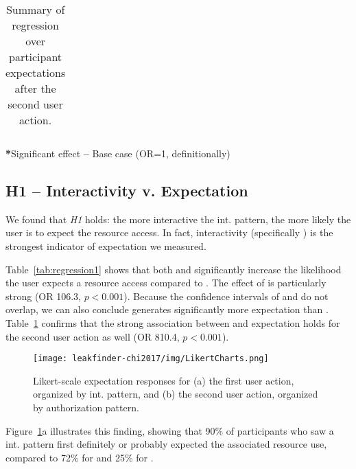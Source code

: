 \begin{table}[t]
\begin{threeparttable}
\begin{tabular}{l l r c r}
     \bottomrule \bottomrule
\end{tabular}
\begin{tablenotes}
     \small
     \item \textbf{*}Significant effect 
      \hspace*{2cm}
      \textbf{--} Base case (OR=1, definitionally)
   \end{tablenotes}
\end{threeparttable}
\caption{Summary of regression over participant expectations after the second
  user action.}
\label{tab:regression2}
\end{table}

\subsection{H1 -- Interactivity v. Expectation}
We found that \textit{H1} holds: the more interactive the int. pattern, the more likely the 
user is to expect the resource access. In fact, interactivity (specifically \interactive{})
is the strongest indicator of expectation we measured.

Table~\ref{tab:regression1} shows that both \interactive{} and \backgroundnotify{}
significantly increase the likelihood the user expects a resource access compared to \backgroundonly{}.
The effect of \interactive{} is particularly strong (OR 106.3, $p< 0.001$). Because the confidence intervals of \interactive{} and \backgroundnotify{} do not overlap, we can also conclude \interactive{} generates
significantly more expectation than \backgroundnotify{}.  Table~\ref{tab:regression2} confirms that the strong 
association between \interactive{} and expectation holds for the second user action as well (OR 810.4, $p < 0.001$).
%
\begin{figure}[b]
  \centering
  \texttt{[image: leakfinder-chi2017/img/LikertCharts.png]}
\caption{Likert-scale expectation responses for (a) the first user action, organized by 
int. pattern, and (b) the second user action, organized by authorization pattern.}
\label{fig:vars_vs_expectation}
\end{figure}
%
Figure~\ref{fig:vars_vs_expectation}a illustrates this finding, showing that 90\% of 
participants who saw a \interactive{} int. pattern first definitely or probably expected 
the associated resource use, compared to 72\% for \backgroundnotify{} and 25\% 
for \backgroundonly{}.

